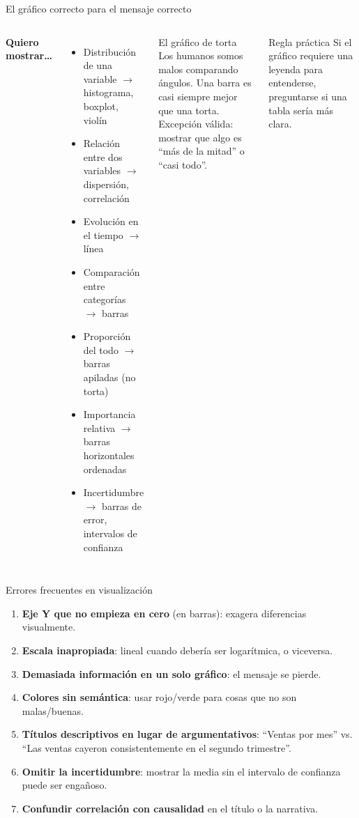 \documentclass[aspectratio=169]{beamer}
\begin{document}
\begin{frame}{El gráfico correcto para el mensaje correcto}
  \begin{columns}
      \textbf{Quiero mostrar\ldots}
      \begin{itemize}
        \item Distribución de una variable $\rightarrow$ histograma, boxplot, violín
        \item Relación entre dos variables $\rightarrow$ dispersión, correlación
        \item Evolución en el tiempo $\rightarrow$ línea
        \item Comparación entre categorías $\rightarrow$ barras
        \item Proporción del todo $\rightarrow$ barras apiladas (no torta)
        \item Importancia relativa $\rightarrow$ barras horizontales ordenadas
        \item Incertidumbre $\rightarrow$ barras de error, intervalos de confianza
      \end{itemize}
      \begin{alertblock}{El gráfico de torta}
        Los humanos somos malos comparando ángulos. Una barra es casi siempre mejor que una torta.\\
        Excepción válida: mostrar que algo es ``más de la mitad'' o ``casi todo''.
      \end{alertblock}
      \bigskip
      \begin{exampleblock}{Regla práctica}
        Si el gráfico requiere una leyenda para entenderse, preguntarse si una tabla sería más clara.
      \end{exampleblock}
  \end{columns}
\end{frame}

\begin{frame}{Errores frecuentes en visualización}
  \begin{enumerate}
    \item \textbf{Eje Y que no empieza en cero} (en barras): exagera diferencias visualmente.
    \item \textbf{Escala inapropiada}: lineal cuando debería ser logarítmica, o viceversa.
    \item \textbf{Demasiada información en un solo gráfico}: el mensaje se pierde.
    \item \textbf{Colores sin semántica}: usar rojo/verde para cosas que no son malas/buenas.
    \item \textbf{Títulos descriptivos en lugar de argumentativos}: ``Ventas por mes'' vs. ``Las ventas cayeron consistentemente en el segundo trimestre''.
    \item \textbf{Omitir la incertidumbre}: mostrar la media sin el intervalo de confianza puede ser engañoso.
    \item \textbf{Confundir correlación con causalidad} en el título o la narrativa.
  \end{enumerate}
\end{frame}
\end{document}
